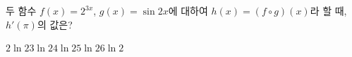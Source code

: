 두 함수 $f(x)=2^{3x}$, $g(x)=\sin 2x$에 대하여 $h(x)=(f\circ g)(x)$라 할 때, $h'(\pi)$의 값은?
\begin{choices32}{$2\ln 2$}{$3\ln 2$}{$4\ln 2$}{$5\ln 2$}{$6\ln 2$}\end{choices32}
